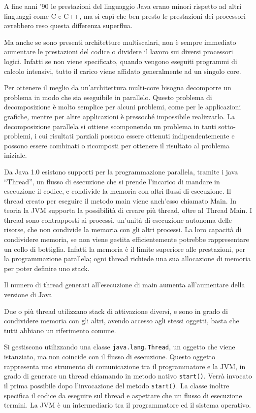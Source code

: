 \documentclass{article}
\numberwithin{equation}{subsection}
\begin{document}
A fine anni '90 le prestazioni del linguaggio Java erano minori rispetto ad altri linguaggi come C e C++, ma si capì che ben presto le prestazioni dei processori avrebbero 
reso questa differenza superflua. 


Ma anche se sono presenti architetture multiscalari, non è sempre immediato aumentare le prestazioni del codice o dividere il lavoro sui diversi processori logici. Infatti 
se non viene specificato, quando vengono eseguiti programmi di calcolo intensivi, tutto il carico viene affidato generalmente ad un singolo core. 

Per ottenere il meglio da un'architettura multi-core bisogna decomporre un problema in modo che sia eseguibile in parallelo. Questo problema di decomposizione è molto semplice 
per alcuni problemi, come per le applicazioni grafiche, mentre per altre applicazioni è pressoché impossibile realizzarlo. 
La decomposizione parallela si ottiene scomponendo un problema in tanti sotto-problemi, i cui risultati parziali possono essere ottenuti indipendentemente e possono essere 
combinati o ricomposti per ottenere il risultato al problema iniziale. 


Da Java 1.0 esistono supporti per la programmazione parallela, tramite i java ``Thread'', un flusso di esecuzione che si prende l'incarico di mandare in esecuzione il 
codice, e condivide la memoria con altri flussi di esecuzione. Il thread creato per eseguire il metodo main viene anch'esso chiamato Main. In teoria la JVM supporta la 
possibilità di creare più thread, oltre al Thread Main. I thread sono contrapposti ai processi, un'unità di esecuzione 
autonoma delle risorse, che non condivide la memoria con gli altri processi. La loro capacità di condividere memoria, se non viene gestita efficientemente potrebbe 
rappresentare un collo di bottiglia. Infatti la memoria è il limite superiore alle prestazioni, per la programmazione parallela; ogni thread richiede una sua 
allocazione di memoria per poter definire uno stack. 

Il numero di thread generati all'esecuzione di main aumenta all'aumentare della versione di Java %

Due o più thread utilizzano stack di attivazione diversi, e sono in grado di condividere memoria con gli altri, avendo accesso agli stessi oggetti, basta che tutti abbiano 
un riferimento comune. 


Si gestiscono utilizzando una classe \verb|java.lang.Thread|, un oggetto che viene istanziato, ma non coincide con il flusso di esecuzione. Questo oggetto rappresenta uno 
strumento di comunicazione tra il programmatore e la JVM, in grado di generare un thread chiamando in metodo nativo \verb|start()|. Verrà invocato il prima possibile dopo 
l'invocazione del metodo \verb|start()|. La classe inoltre specifica il codice da eseguire sul thread e aspettare che un flusso di esecuzione termini. 
La JVM è un intermediario tra il programmatore ed il sistema operativo. 
\end{document}
